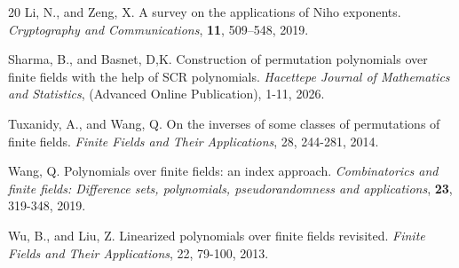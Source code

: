 \documentclass[12pt]{amsart}
\theoremstyle{definition}
\theoremstyle{remark}
\numberwithin{equation}{section}
\begin{document}
\begin{thebibliography}{20}
Li, N., and Zeng, X. A survey on the applications of Niho exponents. {\em Cryptography and Communications}, \textbf{11}, 509–548, 2019.

Sharma, B., and Basnet, D,K. Construction of permutation polynomials over finite fields with the help of SCR polynomials. {\em Hacettepe Journal of Mathematics and Statistics}, (Advanced Online Publication), 1-11, 2026.

Tuxanidy, A., and Wang, Q. On the inverses of some classes of permutations of finite fields. {\em Finite Fields and Their Applications}, 28, 244-281, 2014.



Wang, Q. Polynomials over finite fields: an index approach. {\em Combinatorics and finite fields: Difference sets, polynomials, pseudorandomness and applications}, \textbf{23}, 319-348, 2019.

Wu, B., and Liu, Z. Linearized polynomials over finite fields revisited. {\em Finite Fields and Their Applications}, 22, 79-100, 2013.


    



    
\end{thebibliography}	
	
\end{document}
